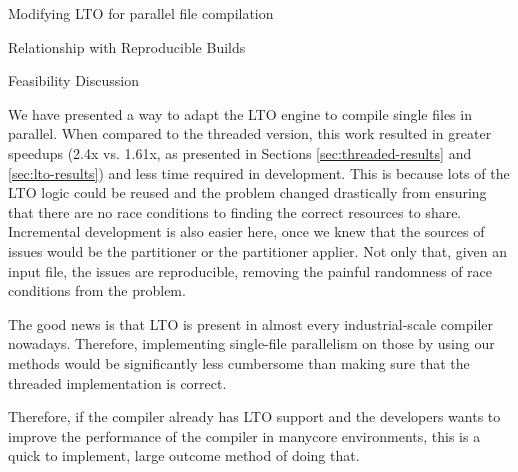 \begin{section}{Modifying LTO for parallel file compilation}
\begin{subsection}{Relationship with Reproducible Builds}
\end{subsection}

\begin{subsection}{Feasibility Discussion}

We have presented a way to adapt the LTO engine to compile single files in
parallel. When compared to the threaded version, this work resulted in greater
speedups (2.4x vs. 1.61x, as presented in Sections \ref{sec:threaded-results}
and \ref{sec:lto-results}) and less time required in development. This is
because lots of the LTO logic could be reused and the problem changed
drastically from ensuring that there are no race conditions to finding the
correct resources to share. Incremental development is also easier here, once
we knew that the sources of issues would be the partitioner or the partitioner
applier. Not only that, given an input file, the issues are reproducible,
removing the painful randomness of race conditions from the problem.

The good news is that LTO is present in almost every industrial-scale compiler
nowadays. Therefore, implementing single-file parallelism on those by using our
methods would be significantly less cumbersome than making sure that the
threaded implementation is correct.

Therefore, if the compiler already has LTO support and the developers wants
to improve the performance of the compiler in manycore environments, this is a
quick to implement, large outcome method of doing that.


\end{subsection}
\end{section}

%


